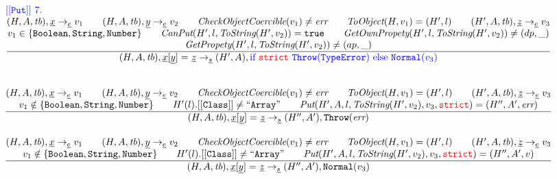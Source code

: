 \documentclass[a4paper, leqno]{amsart}
\newcommand{\rulesep}{\quad\quad}
\newcommand{\stmt}{s}
\newcommand{\expr}{e}
\newcommand{\ir}[1]{\ensuremath{\underline{#1}}}
\newcommand{\irid}{\ir{x}}
\newcommand{\reject}{\inblue\mbox{if \strict}\ {\tt Throw}(\te)\ \mbox{else}\ {\tt Normal}(v_3)}
\def\inred{\color{red}}
\def\inblue{\color{blue}}
\newcommand{\strict}{{\inred\tt strict}}
\newcommand{\true}{{\tt true}}
\newcommand{\tb}{\emph{tb}}
\newcommand{\err}{\emph{err}}
\newcommand{\te}{{\tt TypeError}}
\newcommand{\hf}[1]{\emph{#1}}
\newcommand{\state}{\ensuremath{(H,A,\tb)}}
\newcommand{\evale}{\ensuremath{(H,A,\tb)}}
\def\inred{\color{red}}
\def\inblue{\color{blue}}
\begin{document}
\[\begin{array}{l@{~~}l@{~~}ll}
{\inblue {\tt[[Put]]}\ 7.}\\
\frac{\begin{matrix}
\evale, \irid \rightarrow_{\ir\expr} v_1
\rulesep
\evale, \ir{y} \rightarrow_{\ir\expr} v_2
\rulesep
\hf{CheckObjectCoercible}(v_1) \not= \err
\rulesep
\hf{ToObject}(H, v_1) = (H',l)
\rulesep
(H', A, \tb), \ir{z} \rightarrow_{\ir\expr} v_3
\\
v_1 \in \{{\tt Boolean, String, Number}\}
\rulesep
\hf{CanPut}(H', l, \hf{ToString}(H', v_2)) = \true
\rulesep
\hf{GetOwnPropety}(H', l, \hf{ToString}(H', v_2)) \not= (dp, \_)
\\
\hf{GetPropety}(H', l, \hf{ToString}(H', v_2)) \not= (ap, \_)
\end{matrix}}{\begin{matrix}
\state, \irid{\tt[}\ir{y}{\tt] =} \ \ir{z} \rightarrow_{\ir\stmt}
(H',A), \reject
\end{matrix}}
\\[2em]

\end{array}
\]

\[
\begin{array}{l@{~~}l@{~~}ll}


\frac{\begin{matrix}
\evale, \irid \rightarrow_{\ir\expr} v_1
\rulesep
\evale, \ir{y} \rightarrow_{\ir\expr} v_2
\rulesep
\hf{CheckObjectCoercible}(v_1) \not= \err
\rulesep
\hf{ToObject}(H, v_1) = (H',l)
\rulesep
(H', A, \tb), \ir{z} \rightarrow_{\ir\expr} v_3
\\
v_1 \notin \{{\tt Boolean, String, Number}\}
\rulesep
H'(l).[[{\tt Class}]] \not= {\tt``Array"} 
\rulesep
\hf{Put}(H', A, l, \hf{ToString}(H', v_2), v_3, \strict) = (H'', A', \err)
\end{matrix}}{\begin{matrix}
\state, \irid{\tt[}\ir{y}{\tt] =} \ \ir{z} \rightarrow_{\ir\stmt}
(H'',A'), {\tt Throw}(\err)
\end{matrix}}
\\[2em]


\frac{\begin{matrix}
\evale, \irid \rightarrow_{\ir\expr} v_1
\rulesep
\evale, \ir{y} \rightarrow_{\ir\expr} v_2
\rulesep
\hf{CheckObjectCoercible}(v_1) \not= \err
\rulesep
\hf{ToObject}(H, v_1) = (H',l)
\rulesep
(H', A, \tb), \ir{z} \rightarrow_{\ir\expr} v_3
\\
v_1 \notin \{{\tt Boolean, String, Number}\}
\rulesep
H'(l).[[{\tt Class}]] \not= {\tt``Array"} 
\rulesep
\hf{Put}(H', A, l, \hf{ToString}(H', v_2), v_3, \strict) = (H'', A', v)
\end{matrix}}{\begin{matrix}
\state, \irid{\tt[}\ir{y}{\tt] =} \ \ir{z} \rightarrow_{\ir\stmt}
(H'',A'), {\tt Normal}(v_3)
\end{matrix}}
\\[2em]


\end{array}
\]
\end{document}
